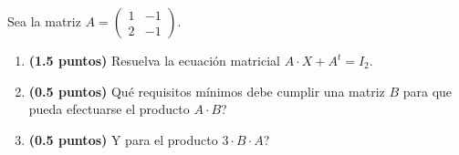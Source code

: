 
Sea la matriz $A=\begin{pmatrix}1&-1\\2&-1\end{pmatrix}$.
\begin{enumerate}[label=\alph*)]
\item \textbf{(1.5 puntos)} Resuelva la ecuación matricial $A\cdot X+A^t=I_2$.
\item \textbf{(0.5 puntos)} \textquestiondown{}Qué requisitos mínimos debe cumplir una matriz $B$ para que pueda efectuarse el producto $A\cdot B$?
\item \textbf{(0.5 puntos)} \textquestiondown{}Y para el producto $3\cdot B\cdot A$?
\end{enumerate}
